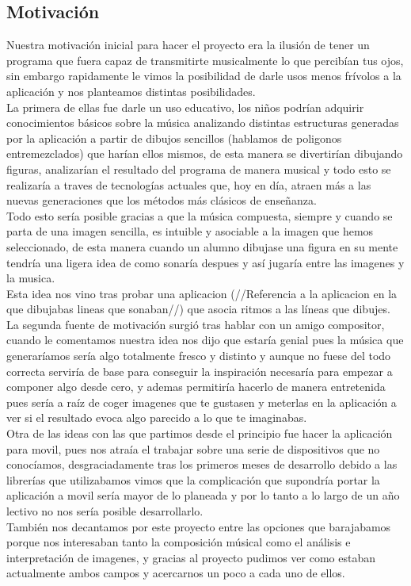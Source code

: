 \subsection{Motivación}

Nuestra motivación inicial para hacer el proyecto era la ilusión de tener un programa que fuera capaz de transmitirte musicalmente lo que percibían tus ojos, sin embargo rapidamente le vimos la posibilidad de darle usos menos frívolos a la aplicación y nos planteamos distintas posibilidades.
\newline
\\La primera de ellas fue darle un uso educativo, los niños podrían adquirir conocimientos básicos sobre la música analizando distintas estructuras generadas por la aplicación a partir de dibujos sencillos (hablamos de poligonos entremezclados) que harían ellos mismos, de esta manera se divertirían dibujando figuras, analizarían el resultado del programa de manera musical y todo esto se realizaría a traves de tecnologías actuales que,  hoy en día, atraen más a las nuevas generaciones que los métodos más clásicos de enseñanza.
\newline
\\Todo esto sería posible gracias a que la música compuesta, siempre y cuando se parta de una imagen sencilla, es intuible y asociable a la imagen que hemos seleccionado, de esta manera cuando un alumno dibujase una figura en su mente tendría una ligera idea de como sonaría despues y así jugaría entre las imagenes y la musica.
\\Esta idea nos vino tras probar una aplicacion (//Referencia a la aplicacion en la que dibujabas lineas que sonaban//) que asocia ritmos a las líneas que dibujes.
\newline
\\La segunda fuente de motivación surgió tras hablar con un amigo compositor, cuando le comentamos nuestra idea nos dijo que estaría genial pues la música que generaríamos sería algo totalmente fresco y distinto y aunque no fuese del todo correcta serviría de base para conseguir la inspiración necesaría para empezar a componer algo desde cero, y ademas permitiría hacerlo de manera entretenida pues sería  a raíz de coger imagenes que te gustasen y meterlas en la aplicación a ver si el resultado evoca algo parecido a lo que te imaginabas.
\newline
\\Otra de las ideas con las que partimos desde el principio fue hacer la aplicación para movil, pues nos atraía el trabajar sobre una serie de dispositivos que no conocíamos, desgraciadamente tras los primeros meses de desarrollo debido a las librerías que utilizabamos vimos que la complicación que supondría portar la aplicación a movil sería mayor de lo planeada y por lo tanto a lo largo de un año lectivo no nos sería posible desarrollarlo.
\\También nos decantamos por este proyecto entre las opciones que barajabamos porque nos interesaban tanto la composición músical como el análisis e interpretación de imagenes, y gracias al proyecto pudimos ver como estaban actualmente ambos campos y acercarnos un poco a cada uno de ellos.